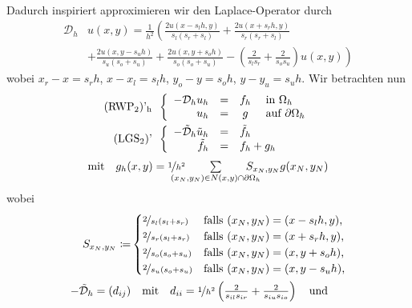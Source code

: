 \documentclass{cheat-sheet}
\newcommand{\bOmega}{\partial \Omega} %
\newcommand{\tss}[1]{\textsubscript{#1}} %
\newcommand{\DO}{\mathcal{D}} %
\begin{document}
\begin{verf} \mbox{}\\
  Dadurch inspiriert approximieren wir den Laplace-Operator durch
  \begin{align*}
    \DO_h & u(x, y) = \frac{1}{h^2} \left( \frac{2 u(x - s_l h, y)}{s_l (s_r {+} s_l)} + \frac{2 u(x+s_r h, y)}{s_r (s_r {+} s_l)} \right. \\
    & \left. + \frac{2 u(x, y {-} s_u h)}{s_u (s_o {+} s_u)}  + \frac{2 u(x, y {+} s_o h)}{s_o (s_o {+} s_u)} - \left( \frac{2}{s_l s_r} + \frac{2}{s_o s_u} \right) u(x, y) \right)
  \end{align*}
  wobei
  $x_r - x = s_r h$, \enspace
  $x - x_l = s_l h$, \enspace
  $y_o - y = s_o h$, \enspace
  $y - y_u = s_u h$.
  Wir betrachten nun
  \begin{align*}
    \text{(RWP\tss{2})'\tss{h}}\enspace & \left\{ \begin{array}{rrcl}
      - \DO_h u_h &=& f_h &\text{ in $\Omega_h$} \\
      u_h &=& g &\text{ auf $\bOmega_h$}
    \end{array} \right. \\
    \text{(LGS\tss{2})'}\enspace & \left\{ \begin{array}{rcl}
      - \tilde{\DO}_h \tilde{u}_h &=& \tilde{f}_h \\
      \tilde{f}_h &=& f_h + g_h
    \end{array} \right.
  \end{align*}
  \[
    \text{mit} \quad
    g_h(x, y) = \nicefrac{1}{h^2} \qquad \sum_{\mathclap{(x_N, y_N) \in N(x, y) \cap \partial \Omega_h}} \qquad S_{x_N,y_N} g(x_N, y_N)
  \]
  wobei
  \begin{align*}
    S_{x_N,y_N} \coloneqq & \begin{cases}
      \nicefrac{2}{s_l (s_l + s_r)} & \text{falls $(x_N, y_N) = (x - s_l h, y)$,} \\
      \nicefrac{2}{s_r (s_l + s_r)} & \text{falls $(x_N, y_N) = (x + s_r h, y)$,} \\
      \nicefrac{2}{s_o (s_o + s_u)} & \text{falls $(x_N, y_N) = (x, y + s_o h)$,} \\
      \nicefrac{2}{s_u (s_o + s_u)} & \text{falls $(x_N, y_N) = (x, y - s_u h)$,} \\
    \end{cases} \\
    - \tilde{\DO}_h = (d_{ij}) & \quad \text{mit} \quad
    d_{ii} = \nicefrac{1}{h^2} \left( \tfrac{2}{s_{il} s_{ir}} + \tfrac{2}{s_{iu} s_{io}} \right) \quad \text{und} \\

\end{align*}
\end{verf}
\end{document}
